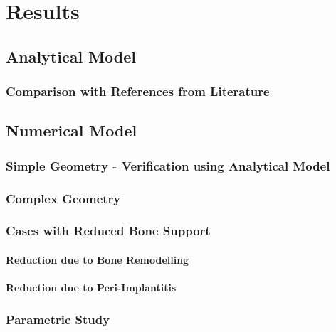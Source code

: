 
\chapter{Results}
\label{chap:Res}

\section{Analytical Model}

\subsection{Comparison with References from Literature}

\section{Numerical Model}

\subsection{Simple Geometry - Verification using Analytical Model}

\subsection{Complex Geometry}

\subsection{Cases with Reduced Bone Support}
\subsubsection{Reduction due to Bone Remodelling}
\subsubsection{Reduction due to Peri-Implantitis}

\subsection{Parametric Study}
